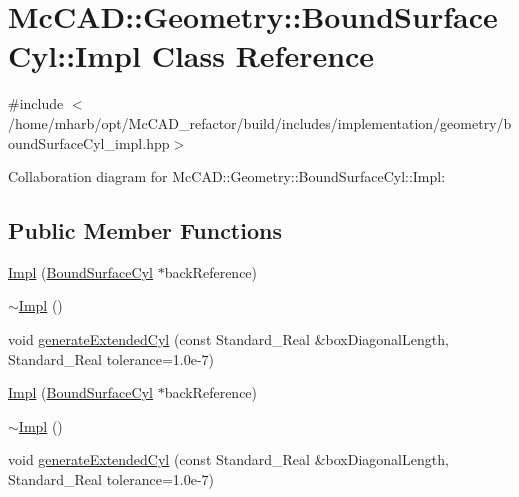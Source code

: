 \hypertarget{classMcCAD_1_1Geometry_1_1BoundSurfaceCyl_1_1Impl}{}\section{Mc\+C\+AD\+:\+:Geometry\+:\+:Bound\+Surface\+Cyl\+:\+:Impl Class Reference}
\label{classMcCAD_1_1Geometry_1_1BoundSurfaceCyl_1_1Impl}


{\ttfamily \#include $<$/home/mharb/opt/\+Mc\+C\+A\+D\+\_\+refactor/build/includes/implementation/geometry/bound\+Surface\+Cyl\+\_\+impl.\+hpp$>$}



Collaboration diagram for Mc\+C\+AD\+:\+:Geometry\+:\+:Bound\+Surface\+Cyl\+:\+:Impl\+:
\subsection*{Public Member Functions}
\begin{DoxyCompactItemize}
\item 
\hyperlink{classMcCAD_1_1Geometry_1_1BoundSurfaceCyl_1_1Impl_a7cfaf77f2f5a1abbb226f2ff2ce88602}{Impl} (\hyperlink{classMcCAD_1_1Geometry_1_1BoundSurfaceCyl}{Bound\+Surface\+Cyl} $\ast$back\+Reference)
\item 
\hyperlink{classMcCAD_1_1Geometry_1_1BoundSurfaceCyl_1_1Impl_a90d4f81ce1ab696d7824ccf119a7eb31}{$\sim$\+Impl} ()
\item 
void \hyperlink{classMcCAD_1_1Geometry_1_1BoundSurfaceCyl_1_1Impl_a53df9dd2413cd4087f9ae38af08ed9b3}{generate\+Extended\+Cyl} (const Standard\+\_\+\+Real \&box\+Diagonal\+Length, Standard\+\_\+\+Real tolerance=1.\+0e-\/7)
\item 
\hyperlink{classMcCAD_1_1Geometry_1_1BoundSurfaceCyl_1_1Impl_a7cfaf77f2f5a1abbb226f2ff2ce88602}{Impl} (\hyperlink{classMcCAD_1_1Geometry_1_1BoundSurfaceCyl}{Bound\+Surface\+Cyl} $\ast$back\+Reference)
\item 
\hyperlink{classMcCAD_1_1Geometry_1_1BoundSurfaceCyl_1_1Impl_a90d4f81ce1ab696d7824ccf119a7eb31}{$\sim$\+Impl} ()
\item 
void \hyperlink{classMcCAD_1_1Geometry_1_1BoundSurfaceCyl_1_1Impl_a53df9dd2413cd4087f9ae38af08ed9b3}{generate\+Extended\+Cyl} (const Standard\+\_\+\+Real \&box\+Diagonal\+Length, Standard\+\_\+\+Real tolerance=1.\+0e-\/7)
\end{DoxyCompactItemize}
